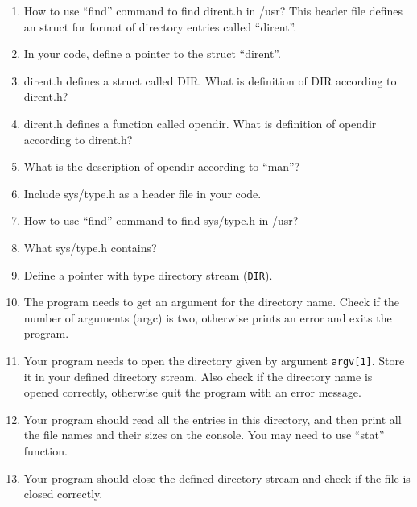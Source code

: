 \documentclass[16pt]{article}
\begin{document}
\begin{enumerate}
\item How to use ``find'' command to find dirent.h in /usr? This header file defines an struct for format of directory entries called ``dirent''.
\item In your code, define a pointer to the struct ``dirent''.
\item dirent.h defines a struct called DIR. What is definition of DIR according to dirent.h?
\item dirent.h defines a function called opendir. What is definition of opendir according to dirent.h?
\item What is the description of opendir according to ``man''?
\item Include sys/type.h as a header file in your code.  
\item How to use ``find'' command to find sys/type.h in /usr? 
\item What sys/type.h contains?
\item Define a pointer with type directory stream (\texttt{DIR}).
\item The program needs to get an argument for the directory name. Check if the number of arguments (argc) is two, otherwise prints an error and exits the program.
\item Your program needs to open the directory given by
argument \texttt{argv[1]}. 
 Store it in your defined directory stream.
 Also check if the directory name is opened correctly,
 otherwise quit the program with an error message.
 \item Your program should read all the entries in this directory, and
then print all the file names and their sizes on the console. You may need to use ``stat'' function.
\item Your program should close the defined directory stream and check if the file is closed correctly.
\end{enumerate}
\end{document}
